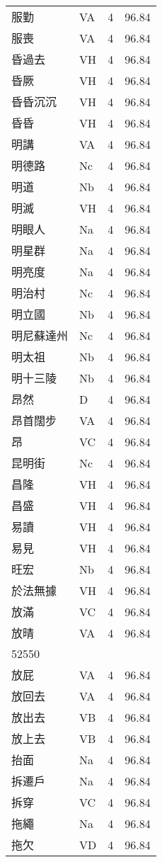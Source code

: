 \documentclass[twocolumn]{book}
\begin{document}
\begin{supertabular}{llrr}
服勤 & VA & 4 &  96.84\\
服喪 & VA & 4 &  96.84\\
昏過去 & VH & 4 &  96.84\\
昏厥 & VH & 4 &  96.84\\
昏昏沉沉 & VH & 4 &  96.84\\
昏昏 & VH & 4 &  96.84\\
明講 & VA & 4 &  96.84\\
明德路 & Nc & 4 &  96.84\\
明道 & Nb & 4 &  96.84\\
明滅 & VH & 4 &  96.84\\
明眼人 & Na & 4 &  96.84\\
明星群 & Na & 4 &  96.84\\
明亮度 & Na & 4 &  96.84\\
明治村 & Nc & 4 &  96.84\\
明立國 & Nb & 4 &  96.84\\
明尼蘇達州 & Nc & 4 &  96.84\\
明太祖 & Nb & 4 &  96.84\\
明十三陵 & Nb & 4 &  96.84\\
昂然 & D & 4 &  96.84\\
昂首闊步 & VA & 4 &  96.84\\
昂 & VC & 4 &  96.84\\
昆明街 & Nc & 4 &  96.84\\
昌隆 & VH & 4 &  96.84\\
昌盛 & VH & 4 &  96.84\\
易讀 & VH & 4 &  96.84\\
易見 & VH & 4 &  96.84\\
旺宏 & Nb & 4 &  96.84\\
於法無據 & VH & 4 &  96.84\\
放滿 & VC & 4 &  96.84\\
放晴 & VA & 4 &  96.84\\
52550\\
放屁 & VA & 4 &  96.84\\
放回去 & VA & 4 &  96.84\\
放出去 & VB & 4 &  96.84\\
放上去 & VB & 4 &  96.84\\
抬面 & Na & 4 &  96.84\\
拆遷戶 & Na & 4 &  96.84\\
拆穿 & VC & 4 &  96.84\\
拖繩 & Na & 4 &  96.84\\
拖欠 & VD & 4 &  96.84\\

\end{supertabular}
\end{document}
